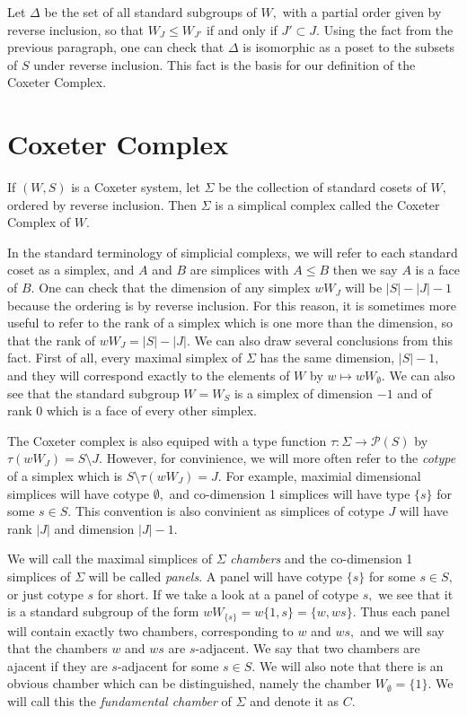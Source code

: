 \documentclass[class=book, crop=false,12 pt]{standalone}
\begin{document}
Let $\Delta$ be the set of all standard subgroups of $W,$ with a partial order given by reverse inclusion, so that $W_J\le W_{J'}$ if and only if $J'\subset J.$ Using the fact from the previous paragraph, one can check that $\Delta$ is isomorphic as a poset to the subsets of $S$ under reverse inclusion. This fact is the basis for our definition of the Coxeter Complex.

\section{Coxeter Complex}
\begin{defn}
	If $(W,S)$ is a Coxeter system, let $\Sigma$ be the collection of standard cosets of $W,$ ordered by reverse inclusion. Then $\Sigma$ is a simplical complex called the Coxeter Complex of $W.$
\end{defn}

In the standard terminology of simplicial complexs, we will refer to each standard coset as a simplex, and $A$ and $B$ are simplices with $A\le B$ then we say $A$ is a face of $B.$ One can check that the dimension of any simplex $wW_J$ will be $|S|-|J|-1$ because the ordering is by reverse inclusion. For this reason, it is sometimes more useful to refer to the rank of a simplex which is one more than the dimension, so that the rank of $wW_J=|S|-|J|.$ We can also draw several conclusions from this fact. First of all, every maximal simplex of $\Sigma$ has the same dimension, $|S|-1,$ and they will correspond exactly to the elements of $W$ by $w\mapsto wW_\emptyset.$ We can also see that the standard subgroup $W=W_S$ is a simplex of dimension $-1$ and of rank 0 which is a face of every other simplex.

The Coxeter complex is also equiped with a type function $\tau:\Sigma \to \mathcal{P}(S)$ by $\tau(wW_J)=S\setminus J.$ However, for convinience, we will more often refer to the \emph{cotype} of a simplex which is $S\setminus \tau(wW_J)=J.$ For example, maximial dimensional simplices will have cotype $\emptyset,$ and co-dimension 1 simplices will have type $\{s\}$ for some $s\in S.$ This convention is also convinient as simplices of cotype $J$ will have rank $|J|$ and dimension $|J|-1.$

We will call the maximal simplices of $\Sigma$ \emph{chambers} and the co-dimension 1 simplices of $\Sigma$ will be called \emph{panels}. A panel will have cotype $\{s\}$ for some $s\in S,$ or just cotype $s$ for short. If we take a look at a panel of cotype $s,$ we see that it is a standard subgroup of the form $wW_{\{s\}}=w\{1,s\}=\{w,ws\}.$ Thus each panel will contain exactly two chambers, corresponding to $w$ and $ws,$ and we will say that the chambers $w$ and $ws$ are $s$-adjacent. We say that two chambers are ajacent if they are $s$-adjacent for some $s\in S.$ We will also note that there is an obvious chamber which can be distinguished, namely the chamber $W_\emptyset=\{1\}.$ We will call this the \emph{fundamental chamber} of $\Sigma$ and denote it as $C.$
\end{document}
